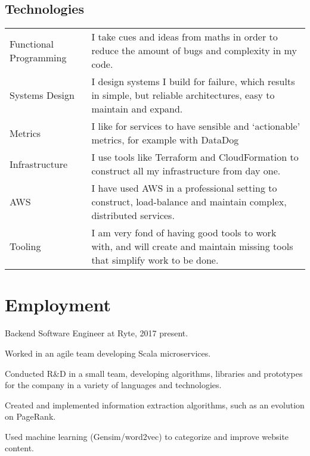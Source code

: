 \documentclass[a4paper]{article}
\renewenvironment{itemize}{
  \begin{list}{}{
    \setlength{\leftmargin}{1.5em}
  }
}{
  \end{list}
}
\begin{document}
\subsection*{Technologies}
\begin{tabular}{ l p{12cm} }
 Functional Programming & I take cues and ideas from maths in order to reduce the
amount of bugs and complexity in my code.\\
Systems Design & I design systems I build for failure, which results in simple,
but reliable architectures, easy to maintain and expand.\\
Metrics & I like for services to have sensible and `actionable' metrics, for
example with DataDog \\
Infrastructure & I use tools like Terraform and CloudFormation to
construct all my \linebreak infrastructure from day one. \\
AWS & I have used AWS in a professional setting to construct, load-balance and
maintain complex, distributed services. \\
Tooling & I am very fond of having good tools to work with, and will create and
maintain missing tools that simplify work to be done. \\
\end{tabular}

\section*{Employment}

\begin{itemize}
\item Backend Software Engineer at Ryte, 2017 {\textendash}
  present.
        \begin{itemize}
            \item Worked in an agile team developing Scala microservices.
            \item Conducted R\&D in a small team, developing algorithms,
              libraries and prototypes for the company in a variety of languages
              and technologies.
            \item Created and implemented information extraction algorithms,
              such as an evolution on PageRank.
            \item Used machine learning (Gensim/word2vec) to categorize and
              improve website content.
        \end{itemize}
\end{itemize}
\end{document}
